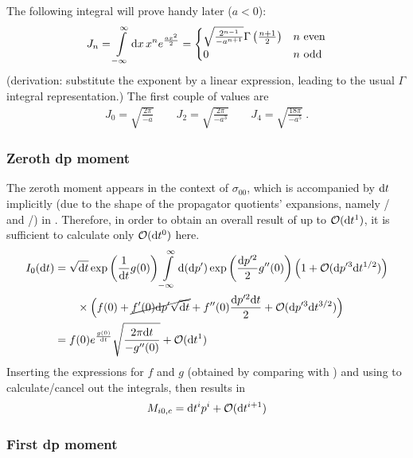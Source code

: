 The following integral will prove handy later (\(a < 0\)):
\begin{align}
	\label{eqn:gaussian_moments}
	J_n = \int\limits_{-\infty}^\infty \mathrm{d} x \, x^n e^{\frac{a x^2}2}
	=
	\begin{cases}
		\sqrt{\frac{2^{n-1}}{-a^{n+1}}} \Gamma\left(\frac{n+1}2\right)
			& n \text{ even}
		\\
		0 & n \text{ odd}
	\end{cases}
\end{align}
(derivation: substitute the exponent by a linear expression, leading to the usual \(\Gamma\) integral representation.) The first couple of values are
\begin{align}
	J_0 = \sqrt{\frac{2\pi}{-a}}
	\qquad
	J_2 = \sqrt{\frac{2\pi}{-a^3}}
	\qquad
	J_4 = \sqrt{\frac{18\pi}{-a^5}} ~.
\end{align}





\subsubsection{Zeroth dp moment}

The zeroth moment appears in the context of \(\sigma_{00}\), which is accompanied by \(\mathrm{d} t\) implicitly (due to the shape of the propagator quotients' expansions, namely /\SF{} and /\HF{}) in . Therefore, in order to obtain an overall result of up to \(\mathcal{O}(\mathrm{d} t^1)\), it is sufficient to calculate only \(\mathcal{O}(\mathrm{d} t^0)\) here.
%
\begin{align*}
	I_0(\mathrm{d} t)
	&=
	\sqrt{\mathrm{d} t}\operatorname{exp}\left(\frac1{\mathrm{d} t}g(0)\right)
	\int\limits_{-\infty}^\infty\mathrm{d}(\mathrm{d} p')\operatorname{exp}\left(\frac{\mathrm{d} p'^2}2g''(0)\right)
	\left(1+\mathcal{O}(\mathrm{d} p'^3\mathrm{d} t^{1/2})\right)
	\\&\qquad
	\times\Bigl(
	f(0)
	+ \cancel{f'(0)\mathrm{d} p'\sqrt{\mathrm{d} t}}
	+ f''(0)\frac{\mathrm{d} p'^2\mathrm{d} t}2
	+ \mathcal{O}(\mathrm{d} p'^3\mathrm{d} t^{3/2})
	\Bigr)
	\\
	&= f(0)e^{\frac{g(0)}{\mathrm{d} t}}\sqrt{\frac{2\pi\mathrm{d} t}{-g''(0)}} + \mathcal{O}(\mathrm{d} t^1)
\end{align*}
%
Inserting the expressions for \(f\) and \(g\) (obtained by comparing  with ) and using  to calculate/cancel out the integrals, then results in
%
\begin{align}
	M_{i0,c} = \mathrm{d} t^i p^i + \mathcal{O}(\mathrm{d} t^{i+1})
\end{align}

\subsubsection{First dp moment}

